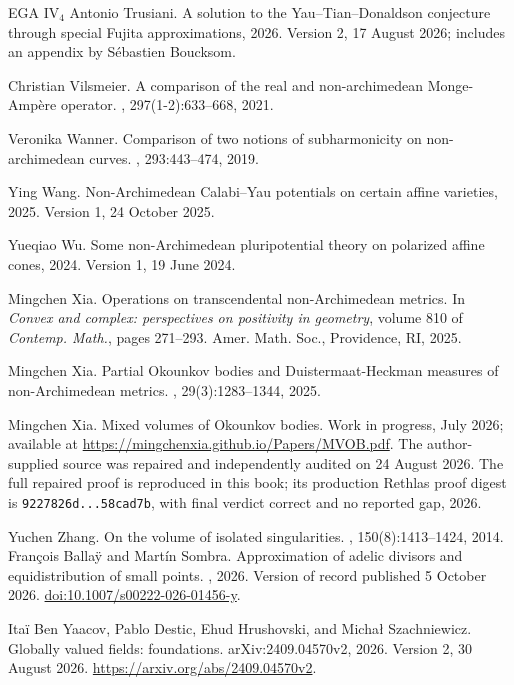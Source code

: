 \documentclass[11pt,a4paper]{article}
\theoremstyle{definition}
\theoremstyle{remark}
\begin{document}
\begin{thebibliography}{EGA IV$_4$}
Antonio Trusiani.
\newblock A solution to the {Y}au--{T}ian--{D}onaldson conjecture through
  special {F}ujita approximations, 2026.
\newblock Version 2, 17 August 2026; includes an appendix by S\'{e}bastien
  Boucksom.

Christian Vilsmeier.
\newblock A comparison of the real and non-archimedean {M}onge-{A}mp\`ere
  operator.
, 297(1-2):633--668, 2021.

Veronika Wanner.
\newblock Comparison of two notions of subharmonicity on non-archimedean
  curves.
, 293:443--474, 2019.

Ying Wang.
\newblock Non-{A}rchimedean {C}alabi--{Y}au potentials on certain affine
  varieties, 2025.
\newblock Version 1, 24 October 2025.

Yueqiao Wu.
\newblock Some non-{A}rchimedean pluripotential theory on polarized affine
  cones, 2024.
\newblock Version 1, 19 June 2024.

Mingchen Xia.
\newblock Operations on transcendental non-{A}rchimedean metrics.
\newblock In {\em Convex and complex: perspectives on positivity in geometry},
  volume 810 of {\em Contemp. Math.}, pages 271--293. Amer. Math. Soc.,
  Providence, RI, 2025.

Mingchen Xia.
\newblock Partial {O}kounkov bodies and {D}uistermaat-{H}eckman measures of
  non-{A}rchimedean metrics.
, 29(3):1283--1344, 2025.

Mingchen Xia.
\newblock Mixed volumes of {O}kounkov bodies.
\newblock Work in progress, July 2026; available at
  \url{https://mingchenxia.github.io/Papers/MVOB.pdf}. The author-supplied
  source was repaired and independently audited on 24 August 2026. The full
  repaired proof is reproduced in this book; its production Rethlas proof
  digest is \texttt{9227826d...58cad7b}, with final verdict correct and no
  reported gap, 2026.

Yuchen Zhang.
\newblock On the volume of isolated singularities.
, 150(8):1413--1424, 2014.
Fran{\c c}ois Balla{\"y} and Mart{\'i}n Sombra.
\newblock Approximation of adelic divisors and equidistribution of small points.
, 2026.
\newblock Version of record published 5 October 2026.
\newblock \href{https://doi.org/10.1007/s00222-026-01456-y}{doi:10.1007/s00222-026-01456-y}.

Ita{\"i} Ben Yaacov, Pablo Destic, Ehud Hrushovski, and Micha{\l} Szachniewicz.
\newblock Globally valued fields: foundations.
\newblock arXiv:2409.04570v2, 2026.
\newblock Version 2, 30 August 2026.
\newblock \url{https://arxiv.org/abs/2409.04570v2}.

\end{thebibliography}
\end{document}

